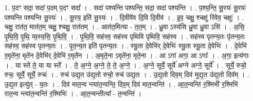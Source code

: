 \documentclass[17pt]{extarticle}
\begin{document}
1. प॒दꣳ सदा॒ सदा॑ प॒दम् प॒दꣳ सदा᳚ । . सदा॑ पश्यन्ति पश्यन्ति॒ सदा॒ सदा॑ पश्यन्ति । . प॒श्य॒न्ति॒ सू॒रयः॑ सू॒रयः॑ पश्यन्ति पश्यन्ति सू॒रयः॑ । . सू॒रय॒ इति॑ सू॒रयः॑ । . दि॒वीवे॑व दि॒वि दि॒वीव॑ । . इ॒व॒ चक्षु॒ श्चक्षु॑ रिवेव॒ चक्षुः॑ । . चक्षु॒ रात॑त॒ मात॑त॒म् चक्षु॒ श्चक्षु॒ रात॑तम् । . आत॑त॒मित्या - त॒त॒म् । . ध्रु॒वा ऽस्य॑सि ध्रु॒वा ध्रु॒वा ऽसि॑ । . अ॒सि॒ पृ॒थि॒वि॒ पृ॒थि॒ व्य॒स्य॒सि॒ पृ॒थि॒वि॒ । . पृ॒थि॒वि॒ सह॑स्व॒ सह॑स्व पृथिवि पृथिवि॒ सह॑स्व । . सह॑स्व पृतन्य॒तः पृ॑तन्य॒तः सह॑स्व॒ सह॑स्व पृतन्य॒तः । . पृ॒त॒न्य॒त इति॑ पृतन्य॒तः । . स्यू॒ता दे॒वेभि॑र् दे॒वेभिः॑ स्यू॒ता स्यू॒ता दे॒वेभिः॑ । . दे॒वेभि॑ र॒मृते॑ना॒ मृते॑न दे॒वेभि॑र् दे॒वेभि॑ र॒मृते॑न । . अ॒मृते॒ना ऽमृते॑ना॒ मृते॒ना । . आ ऽगा॑ अगा॒ आ ऽगाः᳚ । . अ॒गा॒ इत्य॑गाः । . या स्ते॑ ते॒ या या स्ते᳚ । . ते॒ अ॒ग्ने॒ अ॒ग्ने॒ ते॒ ते॒ अ॒ग्ने॒ । . अ॒ग्ने॒ सूर्ये॒ सूर्ये॑ अग्ने अग्ने॒ सूर्ये᳚ । . सूर्ये॒ रुचो॒ रुचः॒ सूर्ये॒ सूर्ये॒ रुचः॑ । . रुच॑ उद्य॒त उ॑द्य॒तो रुचो॒ रुच॑ उद्य॒तः । . उ॒द्य॒तो दिव॒म् दिव॑ मुद्य॒त उ॑द्य॒तो दिव᳚म् । . उ॒द्य॒त इत्यु॑त् - य॒तः । . दिव॑ मात॒न्व न्त्या॑त॒न्वन्ति॒ दिव॒म् दिव॑ मात॒न्वन्ति॑ । . आ॒त॒न्वन्ति॑ र॒श्मिभी॑ र॒श्मिभि॑ रात॒न्व न्त्या॑त॒न्वन्ति॑ र॒श्मिभिः॑ । . आ॒त॒न्वन्तीत्या᳚ - त॒न्वन्ति॑ । \newline
\end{document}
